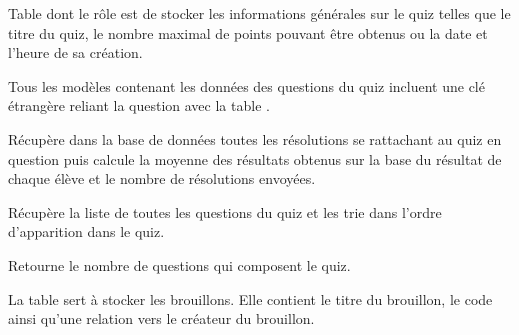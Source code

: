 \documentclass[a4,10pt,french]{sphinxmanual}
\begin{document}
\begin{fulllineitems}
\label{source:quiz.models.Quiz}
Table dont le rôle est de stocker les informations générales sur le quiz telles
que le titre du quiz, le nombre maximal de points pouvant être obtenus ou la date
et l'heure de sa création.

Tous les modèles contenant les données des questions du quiz incluent une clé
étrangère reliant la question avec la table .

\begin{fulllineitems}
\label{source:quiz.models.Quiz.average_result}
Récupère dans la base de données toutes les résolutions se rattachant
au quiz en question puis calcule la moyenne des résultats obtenus sur la base
du résultat de chaque élève et le nombre de résolutions envoyées.

\end{fulllineitems}


\begin{fulllineitems}
\label{source:quiz.models.Quiz.get_questions}
Récupère la liste de toutes les questions du quiz et les trie dans l'ordre
d'apparition dans le quiz.

\end{fulllineitems}


\begin{fulllineitems}
\label{source:quiz.models.Quiz.length}
Retourne le nombre de questions qui composent le quiz.

\end{fulllineitems}


\end{fulllineitems}


\begin{fulllineitems}
\label{source:quiz.models.QuizDraft}
La table  sert à stocker les brouillons. Elle contient le titre
du brouillon, le code ainsi qu'une relation vers le créateur du brouillon.

\end{fulllineitems}
\end{document}
